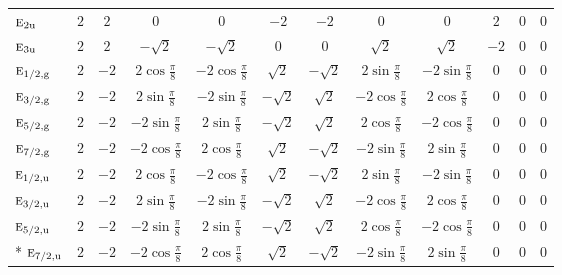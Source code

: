 \documentclass[10pt,a4paper]{article}
\makeatletter
\def\grouprule#1#2{\noalign{\marks\LTgroupmarks{\the\belowrulesep}\nobreak\vskip#1%
  \vskip\aboverulesep}\multispan\LT@cols\unskip{\leaders\hrule\@height#2\hfill\kern\z@}\cr
  \noalign{\penalty\LTrulebreak\vskip\belowrulesep\global\@lastruleclass\z@}}
\numberwithin{equation}{section}
\newcommand{\irr}[1]{\text{\normalfont\scshape #1}}
\newcommand{\ptag}[1]{\mathrm{#1}}
\makeatother
\begin{document}
{{\begin{longtable}{@{}lccccccccccc@{}}
$\irr{e}_{2\ptag{u}}$ & $2$ & $2$ & $0$ & $0$ & $-2$ & $-2$ & $0$ & $0$ & $2$ & $0$ & $0$\\
$\irr{e}_{3\ptag{u}}$ & $2$ & $2$ & $-\sqrt{2}$ & $-\sqrt{2}$ & $0$ & $0$ & $\sqrt{2}$ & $\sqrt{2}$ & $-2$ & $0$ & $0$\\
\grouprule{0pt}{\lightrulewidth}
$\irr{e}_{1/2,\ptag{g}}$ & $2$ & $-2$ & $2\cos\tfrac{\pi}{8}$ & $-2\cos\tfrac{\pi}{8}$ & $\sqrt{2}$ & $-\sqrt{2}$ & $2\sin\tfrac{\pi}{8}$ & $-2\sin\tfrac{\pi}{8}$ & $0$ & $0$ & $0$\\
$\irr{e}_{3/2,\ptag{g}}$ & $2$ & $-2$ & $2\sin\tfrac{\pi}{8}$ & $-2\sin\tfrac{\pi}{8}$ & $-\sqrt{2}$ & $\sqrt{2}$ & $-2\cos\tfrac{\pi}{8}$ & $2\cos\tfrac{\pi}{8}$ & $0$ & $0$ & $0$\\
$\irr{e}_{5/2,\ptag{g}}$ & $2$ & $-2$ & $-2\sin\tfrac{\pi}{8}$ & $2\sin\tfrac{\pi}{8}$ & $-\sqrt{2}$ & $\sqrt{2}$ & $2\cos\tfrac{\pi}{8}$ & $-2\cos\tfrac{\pi}{8}$ & $0$ & $0$ & $0$\\
$\irr{e}_{7/2,\ptag{g}}$ & $2$ & $-2$ & $-2\cos\tfrac{\pi}{8}$ & $2\cos\tfrac{\pi}{8}$ & $\sqrt{2}$ & $-\sqrt{2}$ & $-2\sin\tfrac{\pi}{8}$ & $2\sin\tfrac{\pi}{8}$ & $0$ & $0$ & $0$\\
$\irr{e}_{1/2,\ptag{u}}$ & $2$ & $-2$ & $2\cos\tfrac{\pi}{8}$ & $-2\cos\tfrac{\pi}{8}$ & $\sqrt{2}$ & $-\sqrt{2}$ & $2\sin\tfrac{\pi}{8}$ & $-2\sin\tfrac{\pi}{8}$ & $0$ & $0$ & $0$\\
$\irr{e}_{3/2,\ptag{u}}$ & $2$ & $-2$ & $2\sin\tfrac{\pi}{8}$ & $-2\sin\tfrac{\pi}{8}$ & $-\sqrt{2}$ & $\sqrt{2}$ & $-2\cos\tfrac{\pi}{8}$ & $2\cos\tfrac{\pi}{8}$ & $0$ & $0$ & $0$\\
$\irr{e}_{5/2,\ptag{u}}$ & $2$ & $-2$ & $-2\sin\tfrac{\pi}{8}$ & $2\sin\tfrac{\pi}{8}$ & $-\sqrt{2}$ & $\sqrt{2}$ & $2\cos\tfrac{\pi}{8}$ & $-2\cos\tfrac{\pi}{8}$ & $0$ & $0$ & $0$\\*
$\irr{e}_{7/2,\ptag{u}}$ & $2$ & $-2$ & $-2\cos\tfrac{\pi}{8}$ & $2\cos\tfrac{\pi}{8}$ & $\sqrt{2}$ & $-\sqrt{2}$ & $-2\sin\tfrac{\pi}{8}$ & $2\sin\tfrac{\pi}{8}$ & $0$ & $0$ & $0$\\
\bottomrule\end{longtable}}}
\end{document}
